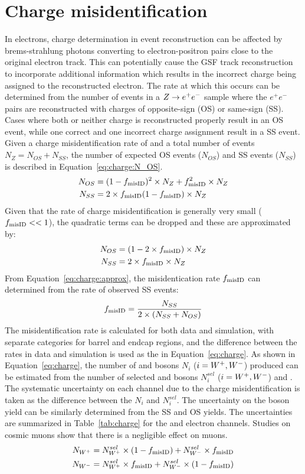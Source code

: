 \section{Charge misidentification}
In electrons, charge determination in event reconstruction can be affected by brems-strahlung photons converting to electron-positron pairs close to the original electron track. This can potentially cause the GSF track reconstruction to incorporate additional information which results in the incorrect charge being assigned to the reconstructed electron. The rate at which this occurs can be determined from the number of events in a $Z \to e^+ e^-$ sample where the $e^+ e^-$ pairs are reconstructed with charges of opposite-sign (OS) or same-sign (SS). Cases where both or neither charge is reconstructed properly result in an OS event, while one correct and one incorrect charge assignment result in a SS event. Given a charge misidentification rate of \fq and a total number of \zee events $N_Z = N_{OS}+N_{SS}$, the number of expected OS events ($N_{OS}$) and SS events ($N_{SS}$) is described in Equation~\ref{eq:charge:N_OS}. 
\begin{equation}
\begin{aligned}
N_{OS} &= (1 - f_{\mathrm{misID}})^2 \times N_Z + f_{\mathrm{misID}}^2 \times N_Z \\
N_{SS} &= 2 \times f_{\mathrm{misID}} (1- f_{\mathrm{misID}}) \times N_Z
\label{eq:charge:N_OS}
\end{aligned}
\end{equation}
Given that the rate of charge misidentification is generally very small ($f_{\mathrm{misID}} << 1$), the quadratic terms can be dropped and these are approximated by: 
\begin{equation}
\begin{aligned}
N_{OS} &= (1 - 2\times f_{\mathrm{misID}}) \times N_Z \\
N_{SS} &= 2 \times f_{\mathrm{misID}} \times N_Z
\label{eq:charge:approx}
\end{aligned}
\end{equation}
From Equation~\ref{eq:charge:approx}, the misidentication rate $f_{\mathrm{misID}}$ can determined from the rate of observed SS events: 
\begin{equation}
f_{\mathrm{misID}} = \frac{N_{SS}}{2\times(N_{SS} + N_{OS})}
\end{equation}
The misidentification rate is calculated for both data and simulation, with separate categories for barrel and endcap regions, and the difference between the rates in data and simulation is used as the \fq in Equation~\ref{eq:charge}. As shown in Equation~\ref{eq:charge}, the number of \Wp and \Wm bosons $N_{i}$ ($i= W^+, W^-$) produced can be estimated from the number of selected \Wp and \Wm bosons $N^{sel}_{i}$ ($i= W^+, W^-$) and \fq. The systematic uncertainty on each channel due to the charge misidentification is taken as the difference between the $N_i$ and $N_i^{sel}$. The uncertainty on the \Z boson yield can be similarly determined from the SS and OS yields. The uncertainties are summarized in Table~\ref{tab:charge} for the \sg and \sh electron channels. Studies on cosmic muons show that there is a negligible effect on muons.
\begin{equation}
\begin{aligned}
    N_{W^+} = N_{W^+}^{sel} \times (1-f_{\mathrm{misID}}) + N_{W^-}^{sel} \times f_{\mathrm{misID}} \\
    N_{W^-} = N_{W^+}^{sel} \times f_{\mathrm{misID}} + N_{W^-}^{sel} \times (1 - f_{\mathrm{misID}})
\label{eq:charge}
\end{aligned}
\end{equation}
 

